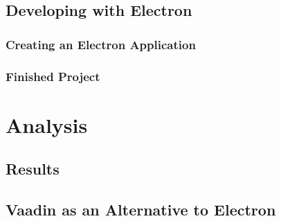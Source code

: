 \documentclass[11pt]{article}
\begin{document}
    \subsection{Developing with Electron}\label{subsec:developing-with-electron}
    
    \subsubsection{Creating an Electron Application}\label{subsubsec:dev-workflow}
    

    \subsubsection{Finished Project}\label{subsubsec:dev-project}


    \section{Analysis}\label{sec:analysis}

    \subsection{Results}\label{subsec:results}

    \subsection{Vaadin as an Alternative to Electron}\label{subsec:vaadin-electron}
    \pagebreak
    \printbibliography
    \pagebreak
    \listoffigures
\end{document}
